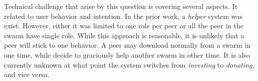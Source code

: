 	
Technical challenge that arise by this question is covering several aspects. It related to user behavior and intention. In the prior work, a \textit{helper} system was exist. However, either it was limited to one role per peer or all the peer in the swarm have single role. While this approach is reasonable, it is unlikely that a peer will stick to one behavior. A peer may download normally from a swarm in one time, while decide to graciously help another swarm in other time. It is also currently unknown at what point the system switches from \textit{investing} to \textit{donating}, and vice versa.